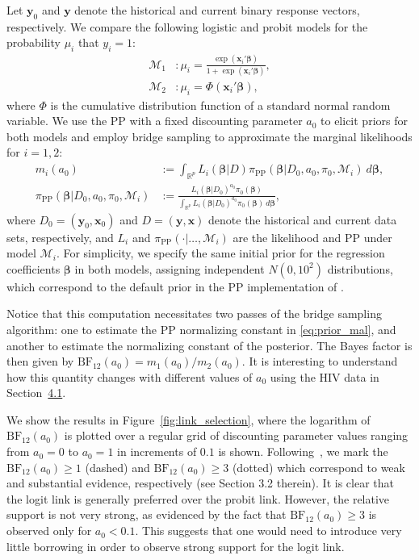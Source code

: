Let $\boldsymbol{y}_0$ and $\boldsymbol{y}$ denote the historical and current binary response vectors, respectively. We compare the following logistic and probit models for the probability $\mu_i$ that $y_i = 1$:
\begin{align}
\mathcal{M}_1&: \mu_i = \frac{\exp\left(\bm{x}_i'\bm{\beta}\right)}{1 + \exp\left(\bm{x}_i'\bm{\beta}\right)},\\
\mathcal{M}_2&:  \mu_i = \Phi\left(\bm{x}_i'\bm{\beta}\right),
\end{align}
where $\Phi$ is the cumulative distribution function of a standard normal random variable. We use the PP with a fixed discounting parameter $a_0$ to elicit priors for both models and employ bridge sampling to approximate the marginal likelihoods for $i = 1, 2$:
\begin{align}
    \label{eq:posterior_mal}
    m_i(a_0) &:=  \int_{\mathbb{R}^p} L_i(\bm{\beta} | D) \pi_{\text{PP}}(\bm{\beta} | D_{0}, a_{0}, \pi_0, \mathcal{M}_i) ~d\bm{\beta},\\
    \label{eq:prior_mal}
    \pi_{\text{PP}}(\bm{\beta} | D_{0}, a_{0}, \pi_0, \mathcal{M}_i) &:= \frac{L_i(\bm{\beta} | D_0)^{a_0}\pi_0(\bm{\beta})}{ \int_{\mathbb{R}^p} L_i(\bm{\beta} | D_0)^{a_0}\pi_0(\bm{\beta}) ~d\bm{\beta}},
\end{align}
where $D_0 = (\bm{y}_0, \bm{x}_0)$ and $D = (\bm{y}, \bm{x})$ denote the historical and current data sets, respectively, and $L_i$ and $\pi_{\text{PP}}(\cdot | \ldots, \mathcal{M}_i)$ are the likelihood and PP under model $\mathcal{M}_i$. For simplicity, we specify the same initial prior for the regression coefficients $\bm{\beta}$ in both models, assigning independent $N(0, 10^2)$ distributions, which correspond to the default prior in the PP implementation of .

Notice that this computation necessitates two passes of the bridge sampling algorithm: one to estimate the PP normalizing constant in \eqref{eq:prior_mal}, and another to estimate the normalizing constant of the posterior. The Bayes factor is then given by $\text{BF}_{12}(a_0) = m_1(a_0)/m_2(a_0)$.
It is interesting to understand how this quantity changes with different values of $a_0$ using the HIV data in Section~\hyperref[sec:dataanalysis_logistic]{4.1}.

We show the results in Figure~\ref{fig:link_selection}, where the logarithm of $\text{BF}_{12}(a_0)$ is plotted over a regular grid of discounting parameter values ranging from $a_0 = 0$ to $a_0 = 1$ in increments of $0.1$ is shown.
Following~\cite{kass1995bayes}, we mark the $\text{BF}_{12}(a_0) \geq 1$ (dashed) and $\text{BF}_{12}(a_0) \geq 3$ (dotted) which correspond to weak and substantial evidence, respectively (see Section 3.2 therein).
It is clear that the logit link is generally preferred over the probit link.
However, the relative support is not very strong, as evidenced by the fact that $\text{BF}_{12}(a_0) \geq 3$ is observed only for $a_0 < 0.1$.
This suggests that one would need to introduce very little borrowing in order to observe strong support for the logit link.

